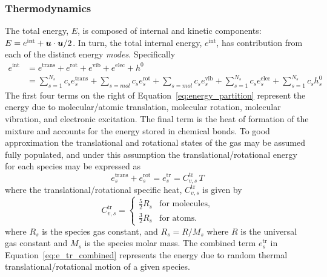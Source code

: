 \subsubsection{Thermodynamics}

The total energy, $E$, is composed of internal and kinetic components: $E = e^{\text{int}} + {\boldsymbol{u}}\cdot{\boldsymbol{u}}/2$.  In turn, the total internal energy, $e^{\text{int}}$, has contribution from each of the distinct energy \emph{modes}.  Specifically
\begin{align}
  e^{\text{int}} &= e^{\text{trans}} + e^{\text{rot}} + e^{\text{vib}} + e^{\text{elec}}  + h^0 \\
         &= \sum_{s=1}^{N_s} c_s e^{\text{trans}}_s +  \sum_{s=mol} c_s e^{\text{rot}}_s +  \sum_{s=mol} c_s e^{\text{vib}}_s +  \sum_{s=1}^{N_s} c_s e^{\text{elec}}_s +  \sum_{s=1}^{N_s} c_s h^0_s  \label{eq:energy_partition}
\end{align}
The first four terms on the right of Equation~\eqref{eq:energy_partition} represent the energy due to molecular/atomic translation, molecular rotation, molecular vibration, and electronic excitation.  The final term is the heat of formation of the mixture and accounts for the energy stored in chemical bonds.  To good approximation the translational and rotational states of the gas may be assumed fully populated, and under this assumption the translational/rotational energy for each species may be expressed as
\begin{equation}
  \label{eq:e_tr_combined}
  e^{\text{trans}}_s + e^{\text{rot}}_s = e^{\text{tr}}_s = C^{\text{tr}}_{v,s}\, T
\end{equation}
where the translational/rotational specific heat, $C^{\text{tr}}_{v,s}$ is given by
\begin{equation}
  C^{\text{tr}}_{v,s} = 
  \begin{cases}
    \frac{5}{2} R_s & \text{for molecules}, \\
    \frac{3}{2} R_s & \text{for atoms.}
  \end{cases}
\end{equation}
where $R_s$ is the species gas constant, and $R_s = R/M_s$ where $R$ is the universal gas constant and $M_s$ is the species molar mass.  The combined term $e^{\text{tr}}_s$ in Equation~\eqref{eq:e_tr_combined} represents the energy due to random thermal translational/rotational motion of a given species.

